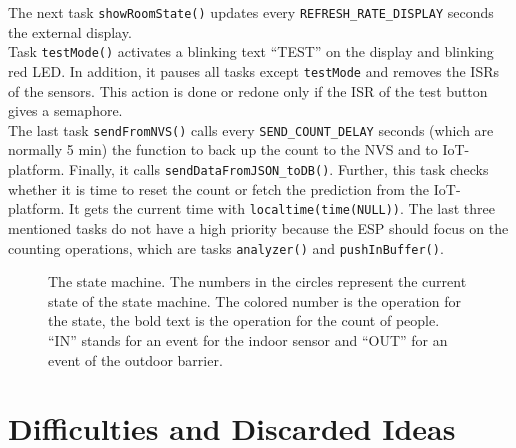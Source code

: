 The next task \verb!showRoomState()! updates every \verb!REFRESH_RATE_DISPLAY! seconds the external display.\\
Task \verb!testMode()! activates a blinking text ``TEST'' on the display and blinking red LED. In addition,
it pauses all tasks except \verb!testMode! and removes the ISRs of the sensors. This action is done or redone
only if the ISR of the test button gives a semaphore.\\
The last task \verb!sendFromNVS()! calls every \verb!SEND_COUNT_DELAY! seconds (which are normally 5 min)
the function to back up the count to the NVS and to IoT-platform. Finally, it calls \verb!sendDataFromJSON_toDB()!.
Further, this task checks whether it is time to reset the count or fetch the prediction from the IoT-platform.
It gets the current time with \verb!localtime(time(NULL))!.
The last three mentioned tasks do not have a high priority because the ESP should focus on the counting
operations, which are tasks \verb!analyzer()! and \verb!pushInBuffer()!.



\begin{figure}%
    \centering
    \resizebox{1\textwidth}{!}{
        
    }
    \caption[The used state machine]{The state machine. The numbers in the circles represent the current state
        of the state machine. The colored number is the operation for the state, the bold text is the operation
        for the count of people. ``IN'' stands for an event for the indoor sensor and ``OUT'' for an event
        of the outdoor barrier.}
    \label{fig_stateMachine}
\end{figure}




\section{Difficulties and Discarded Ideas}\label{diff_and_ideas}

